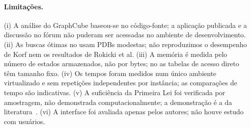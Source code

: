 \paragraph{Limitações.}
(i) A análise do GraphCube baseou-se no código-fonte; a aplicação publicada e a discussão no fórum não puderam ser acessadas no ambiente de desenvolvimento.
(ii) As buscas ótimas no  usam PDBs modestas; não reproduzimos o desempenho de Korf nem os resultados de Rokicki et al.
(iii) A memória é medida pelo número de estados armazenados, não por bytes; no  as tabelas de acesso direto têm tamanho fixo.
(iv) Os tempos foram medidos num único ambiente virtualizado e sem repetições independentes por instância; as comparações de tempo são indicativas.
(v) A suficiência da Primeira Lei foi verificada por amostragem, não demonstrada computacionalmente; a demonstração é a da literatura~\cite{joyner2008}.
(vi) A interface foi avaliada apenas pelos autores; não houve estudo com usuários.
